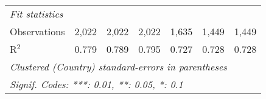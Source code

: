 \begin{tabular}{lcccccc}
   \midrule \emph{Fit statistics}\\
   Observations                                                                                        & 2,022         & 2,022          & 2,022          & 1,635          & 1,449          & 1,449\\  
   R$^2$                                                                                               & 0.779         & 0.789          & 0.795          & 0.727          & 0.728          & 0.728\\  
   \midrule
   \multicolumn{7}{l}{\emph{Clustered (Country) standard-errors in parentheses}}\\
   \multicolumn{7}{l}{\emph{Signif. Codes: ***: 0.01, **: 0.05, *: 0.1}}\\
\end{tabular}
\par\endgroup



